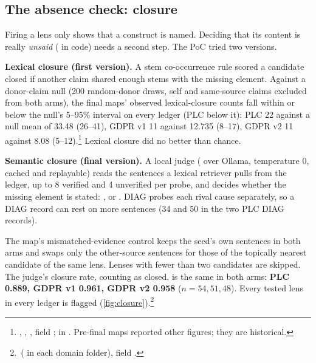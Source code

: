 \subsection{The absence check: closure}
\label{sec:absence-check}

Firing a lens only shows that a construct is named. Deciding that its content is really
\emph{unsaid} ( in code) needs a second step. The PoC tried two versions.

\textbf{Lexical closure (first version).} A stem co-occurrence rule scored a candidate closed if
another claim shared enough stems with the missing element. \evobs{} Against a donor-claim null
(200 random-donor draws, self and same-source claims excluded from both arms), the final maps'
observed lexical-closure counts fall within or below the null's 5--95\% interval on every ledger (PLC
below it): PLC 22 against a null mean of 33.48 (26--41), GDPR v1 11 against 12.735 (8--17), GDPR v2
11 against 8.08 (5--12).\footnote{,
, , field
;  in .
Pre-final maps reported other figures; they are historical.} Lexical closure did no better than
chance.

\textbf{Semantic closure (final version).} A local judge ( over Ollama,
temperature 0, cached and replayable) reads the sentences a lexical retriever pulls from the ledger,
up to 8 verified and 4 unverified per probe, and decides whether the missing element is stated:
,  or . DIAG probes each rival cause separately, so a DIAG
record can rest on more sentences (34 and 50 in the two PLC DIAG records).

\evobs{} The map's mismatched-evidence control keeps the seed's own sentences in both arms and swaps only the
other-source sentences for those of the topically nearest candidate of the same lens. Lenses with
fewer than two candidates are skipped. The judge's closure rate, counting  as closed,
is the same in both arms: \textbf{PLC 0.889, GDPR v1 0.961, GDPR v2 0.958} ($n = 54, 51, 48$).
Every tested lens in every ledger is flagged 
(\cref{fig:closure}).\footnote{\,( in each domain folder), field
.}

